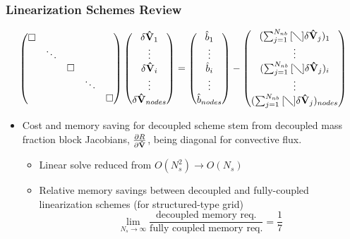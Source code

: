 \documentclass{beamer}
\begin{document}
\begin{frame}
  \frametitle{Linearization Schemes Review}
  \tiny
  \begin{equation*}
    \label{dc_sys} 
    \begin{pmatrix} 
      \Box & & & & \\ & \ddots & & & \\ & & \Box \\ & & & \ddots & \\ & & & & \Box
    \end{pmatrix}
    \begin{pmatrix}
      \delta \mathbf{\hat{V}}_1 \\ \vdots \\ \delta \mathbf{\hat{V}}_i \\ 
      \vdots \\ \delta \mathbf{\hat{V}}_{nodes}
    \end{pmatrix}
    =
    \begin{pmatrix}
      \hat{b}_1 \\ \vdots \\ \hat{b}_i \\ \vdots \\ \hat{b}_{nodes} 
    \end{pmatrix}
    -
    \begin{pmatrix}
      (\sum_{j=1}^{N_{nb}}{[\diagdown] \delta\mathbf{\hat{V}}_{j}})_1 \\ \vdots \\
      (\sum_{j=1}^{N_{nb}}{[\diagdown] \delta\mathbf{\hat{V}}_{j}})_i \\ \vdots \\
      (\sum_{j=1}^{N_{nb}}{[\diagdown] \delta\mathbf{\hat{V}}_{j}})_{nodes}
    \end{pmatrix} 
  \end{equation*} 
  \normalsize
  \begin{itemize}
    \item Cost and memory saving for decoupled scheme stem from decoupled mass
      fraction block Jacobians, $\frac{\partial R}{\partial \mathbf{\hat{V}}}$, being diagonal for convective
      flux.
      \begin{itemize}
        \item Linear solve reduced from $O(N_{s}^2) \rightarrow O(N_{s})$
        \item Relative memory savings between decoupled and fully-coupled
          linearization schemes (for structured-type grid)\footnotemark
          \begin{equation}
            \lim_{N_s \rightarrow \infty} \frac{\text{decoupled memory req.}}
            {\text{fully coupled memory req.}} = \frac{1}{7}
            \label{mem-savings}
          \end{equation}
      \end{itemize}
  \end{itemize}
\end{frame}
\end{document}
